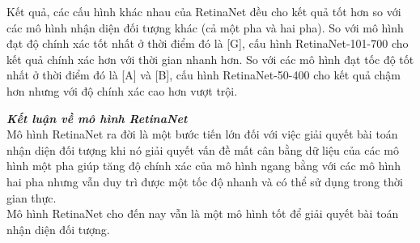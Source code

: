 {    Kết quả, các cấu hình khác nhau của RetinaNet đều cho kết quả tốt hơn so với các mô hình nhận diện đối tượng khác (cả một pha và hai pha).
    So với mô hình đạt độ chính xác tốt nhất ở thời điểm đó là [G], cấu hình RetinaNet-101-700 cho kết quả chính xác hơn với thời gian nhanh hơn.
    So với các mô hình đạt tốc độ tốt nhất ở thời điểm đó là [A] và [B], cấu hình RetinaNet-50-400 cho kết quả chậm hơn nhưng với độ chính xác cao hơn vượt trội.

    \noindent
    \textbf{\textit{Kết luận về mô hình RetinaNet}} \\
    Mô hình RetinaNet ra đời là một bước tiến lớn đối với việc giải quyết bài toán nhận diện đối tượng khi nó giải quyết vấn đề mất cân bằng dữ liệu của các mô hình một pha giúp tăng độ chính xác của mô hình ngang bằng với các mô hình hai pha nhưng vẫn duy trì được một tốc độ nhanh và có thể sử dụng trong thời gian thực. \\
    Mô hình RetinaNet cho đến nay vẫn là một mô hình tốt để giải quyết bài toán nhận diện đối tượng.
}